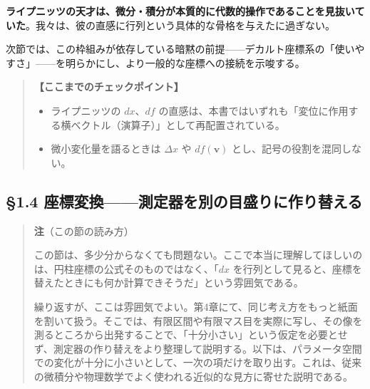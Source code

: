 \documentclass[a4paper,12pt,openany]{book}
\begin{document}
\textbf{ライプニッツの天才は、微分・積分が本質的に代数的操作であることを見抜いていた}。我々は、彼の直感に行列という具体的な骨格を与えたに過ぎない。

次節では、この枠組みが依存している暗黙の前提——デカルト座標系の「使いやすさ」——を明らかにし、より一般的な座標への接続を示唆する。

\par\vspace{0.35em}\par

\begin{quote}
\textbf{【ここまでのチェックポイント】}

\begin{itemize}
\item
  ライプニッツの \(dx\)、\(df\)
  の直感は、本書ではいずれも「変位に作用する横ベクトル（演算子）」として再配置されている。
\item
  微小変化量を語るときは \(\Delta x\) や \(df(\mathbf{v})\)
  とし、記号の役割を混同しない。
\end{itemize}
\end{quote}

\par\vspace{0.35em}\par

\hypertarget{ux5ea7ux6a19ux5909ux63dbux6e2cux5b9aux5668ux3092ux5225ux306eux76eeux76dbux308aux306bux4f5cux308aux66ffux3048ux308b}{%
\subsection{§1.4
座標変換——測定器を別の目盛りに作り替える}\label{ux5ea7ux6a19ux5909ux63dbux6e2cux5b9aux5668ux3092ux5225ux306eux76eeux76dbux308aux306bux4f5cux308aux66ffux3048ux308b}}

\begin{quote}
\textbf{注}（この節の読み方）

この節は、多少分からなくても問題ない。ここで本当に理解してほしいのは、円柱座標の公式そのものではなく、「\(dx\)
を行列として見ると、座標を替えたときにも何か計算できそうだ」という雰囲気である。

繰り返すが、ここは雰囲気でよい。第4章にて、同じ考え方をもっと紙面を割いて扱う。そこでは、有限区間や有限マス目を実際に写し、その像を測るところから出発することで、「十分小さい」という仮定を必要とせず、測定器の作り替えをより整理して説明する。以下は、パラメータ空間での変化が十分に小さいとして、一次の項だけを取り出す。これは、従来の微積分や物理数学でよく使われる近似的な見方に寄せた説明である。
\end{quote}
\end{document}
